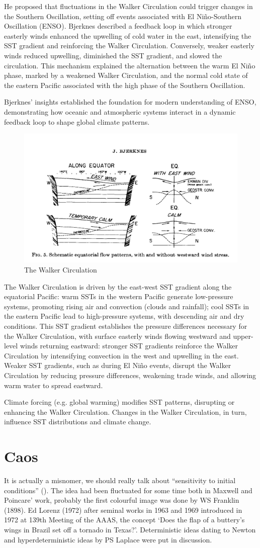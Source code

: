He proposed that fluctuations in the Walker Circulation could trigger changes in the Southern Oscillation, setting off events associated with El Niño-Southern Oscillation (ENSO). Bjerknes described a feedback loop in which stronger easterly winds enhanced the upwelling of cold water in the east, intensifying the SST gradient and reinforcing the Walker Circulation. Conversely, weaker easterly winds reduced upwelling, diminished the SST gradient, and slowed the circulation. This mechanism explained the alternation between the warm El Niño phase, marked by a weakened Walker Circulation, and the normal cold state of the eastern Pacific associated with the high phase of the Southern Oscillation.

Bjerknes’ insights established the foundation for modern understanding of ENSO, demonstrating how oceanic and atmospheric systems interact in a dynamic feedback loop to shape global climate patterns.
\begin{figure}[htpb]
	\centering
	\includegraphics[width=0.35\linewidth]{upload/Screenshot 2024-11-24 191635.png}
	\caption{The Walker Circulation}

\end{figure}
The Walker Circulation is driven by the east-west SST gradient along the equatorial Pacific: warm SSTs in the western Pacific generate low-pressure systems, promoting rising air and convection (clouds and rainfall); cool SSTs in the eastern Pacific lead to high-pressure systems, with descending air and dry conditions.
This SST gradient establishes the pressure differences necessary for the Walker Circulation, with surface easterly winds flowing westward and upper-level winds returning eastward: stronger SST gradients reinforce the Walker Circulation by intensifying convection in the west and upwelling in the east. Weaker SST gradients, such as during El Niño events, disrupt the Walker Circulation by reducing pressure differences, weakening trade winds, and allowing warm water to spread eastward.

Climate forcing (e.g. global warming) modifies SST patterns, disrupting or enhancing the Walker Circulation. Changes in the Walker Circulation, in turn, influence SST distributions and climate change.
\section{Caos}
It is actually a misnomer, we should really talk about “sensitivity to initial conditions” (\cite{Tanner2020}).
The idea had been fluctuated for some time both in Maxwell and Poincare’ work, probably the first colourful image was done by WS Franklin (1898). Ed Lorenz (1972) after seminal works in 1963 and 1969 introduced in 1972 at 139th Meeting of the AAAS, the concept ‘Does the flap of a buttery’s wings in Brazil set off a tornado in Texas?’.
Deterministic ideas dating to Newton and hyperdeterministic ideas by PS Laplace were put in discussion.
